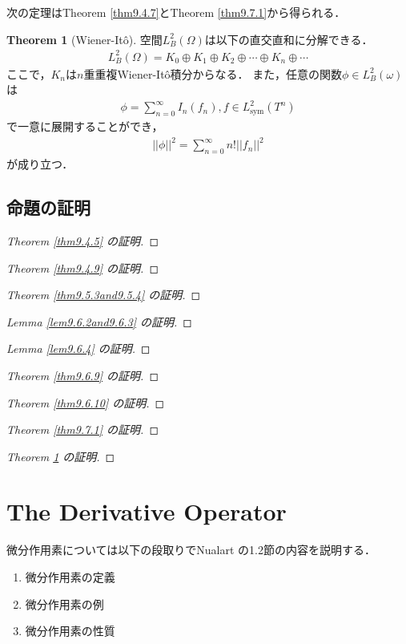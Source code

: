 \documentclass[a4paper,10pt]{jsarticle}
\theoremstyle{definition}
\newtheorem{theorem}{Theorem}
\newcommand{\eq}[1]{\begin{align}#1\end{align}}
\newcommand{\enums}[1]{\begin{enumerate}#1\end{enumerate}}
\begin{document}
次の定理はTheorem \ref{thm9.4.7}とTheorem \ref{thm9.7.1}から得られる．
\begin{theorem}[Wiener-It\^o]\label{thm9.7.3}%
空間$L^2_B(\Omega)$は以下の直交直和に分解できる．
\eq{L^2_B(\Omega)=K_0\oplus K_1\oplus K_2\oplus\cdots\oplus K_n\oplus\cdots}
ここで，$K_n$は$n$重重複Wiener-It\^o積分からなる．
また，任意の関数$\phi\in L^2_B(\omega)$は
\eq{\phi=\sum_{n=0}^\infty I_n(f_n), f\in L^2_\mathrm{sym}(T^n)}
で一意に展開することができ，
\eq{||\phi||^2=\sum_{n=0}^\infty n!||f_n||^2}
が成り立つ．
\end{theorem}

\subsection{命題の証明}
\begin{proof}[Theorem \ref{thm9.4.5} の証明]
\end{proof}
\begin{proof}[Theorem \ref{thm9.4.9} の証明]
\end{proof}
\begin{proof}[Theorem \ref{thm9.5.3and9.5.4} の証明]
\end{proof}
\begin{proof}[Lemma \ref{lem9.6.2and9.6.3} の証明]
\end{proof}\begin{proof}[Lemma \ref{lem9.6.4} の証明]
\end{proof}
\begin{proof}[Theorem \ref{thm9.6.9} の証明]
\end{proof}
\begin{proof}[Theorem \ref{thm9.6.10} の証明]
\end{proof}
\begin{proof}[Theorem \ref{thm9.7.1} の証明]
\end{proof}
\begin{proof}[Theorem \ref{thm9.7.3} の証明]
\end{proof}

\section{The Derivative Operator}
微分作用素については以下の段取りでNualart\cite{Nualart2006} の1.2節の内容を説明する．
\enums{
	\item 微分作用素の定義
	\item 微分作用素の例
	\item 微分作用素の性質
}
\end{document}
